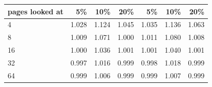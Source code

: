 \begin{tabular}{lrrrrrr}
\toprule
pages looked at & 5\% & 10\% & 20\% & 5\% & 10\% & 20\% \\
\midrule
4 & 1.028 & 1.124 & 1.045 & 1.035 & 1.136 & 1.063 \\
8 & 1.009 & 1.071 & 1.000 & 1.011 & 1.080 & 1.008 \\
16 & 1.000 & 1.036 & 1.001 & 1.001 & 1.040 & 1.001 \\
32 & 0.997 & 1.016 & 0.999 & 0.998 & 1.018 & 0.999 \\
64 & 0.999 & 1.006 & 0.999 & 0.999 & 1.007 & 0.999 \\
\bottomrule
\end{tabular}
